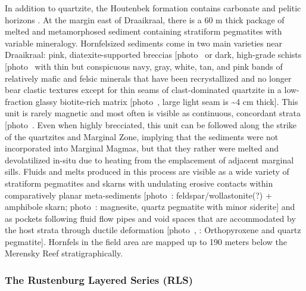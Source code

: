 In addition to quartzite, the Houtenbek formation contains carbonate and
pelitic horizons \citep{button1976}. At the margin east of Draaikraal, there
is a 60 m thick package of melted and metamorphosed sediment containing
stratiform pegmatites with variable mineralogy. Hornfelsized sediments
come in two main varieties near Draaikraal: pink, diatexite-supported
breccias {[}photo~\ChFivePhoto{100}{]} or dark, high-grade schists {[}photo~\ChFivePhoto{29}{]} with
thin but conspicuous navy, gray, white, tan, and pink bands of
relatively mafic and felsic minerals that have been recrystallized and no
longer bear clastic textures except for thin seams of clast-dominated
quartzite in a low-fraction glassy biotite-rich matrix {[}photo~,
large light seam is \textasciitilde4 cm thick{]}. This unit is rarely
magnetic and most often is visible as continuous, concordant strata
{[}photo~\ChFivePhoto{42}{]}. Even when highly brecciated, this unit can be followed
along the strike of the quartzites and Marginal Zone, implying that the
sediments were not incorporated into Marginal Magmas, but that they
rather were melted and devolatilized in-situ due to heating from the
emplacement of adjacent marginal sills. Fluids and melts produced in
this process are visible as a wide variety of stratiform pegmatites and
skarns with undulating erosive contacts within comparatively planar
meta-sediments {[}photo~: feldspar/wollastonite(?) + amphibole skarn;
photo~: magnesite, quartz pegmatite with minor siderite{]} and as
pockets following fluid flow pipes and void spaces that are accommodated
by the host strata through ductile deformation {[}photo~, :
Orthopyroxene and quartz pegmatite{]}. Hornfels in the field area are
mapped up to 190 meters below the Merensky Reef stratigraphically.

\subsubsection{The Rustenburg Layered Series (RLS)}
\label{sec:ch5-rls-units}


